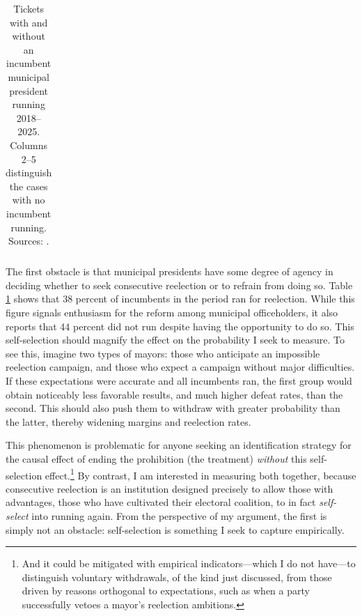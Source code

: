 \documentclass[letter,12pt]{article}
\begin{document}
\begin{table}
\begin{tabular}{crrrrrrr}
    \\ [-2ex] \hline
  \end{tabular}
  \caption{Tickets with and without an incumbent municipal president running 2018--2025. Columns 2--5 distinguish the cases with no incumbent running. Sources: \citet{magar.el.dataset.2026}.}\label{T:incballot}
\end{table}

\noindent The first obstacle is that municipal presidents have some degree of agency in deciding whether to seek consecutive reelection or to refrain from doing so. Table \ref{T:incballot} shows that 38 percent of incumbents in the period ran for reelection. While this figure signals enthusiasm for the reform among municipal officeholders, it also reports that 44 percent did not run despite having the opportunity to do so. This self-selection should magnify the effect on the probability I seek to measure. To see this, imagine two types of mayors: those who anticipate an impossible reelection campaign, and those who expect a campaign without major difficulties. If these expectations were accurate and all incumbents ran, the first group would obtain noticeably less favorable results, and much higher defeat rates, than the second. This should also push them to withdraw with greater probability than the latter, thereby widening margins and reelection rates.

This phenomenon is problematic for anyone seeking an identification strategy for the causal effect of ending the prohibition (the treatment) \emph{without} this self-selection effect.\footnote{And it could be mitigated with empirical indicators---which I do not have---to distinguish voluntary withdrawals, of the kind just discussed, from those driven by reasons orthogonal to expectations, such as when a party successfully vetoes a mayor’s reelection ambitions.} By contrast, I am interested in measuring both together, because consecutive reelection is an institution designed precisely to allow those with advantages, those who have cultivated their electoral coalition, to in fact \emph{self-select} into running again. From the perspective of my argument, the first is simply not an obstacle: self-selection is something I seek to capture empirically.
\end{document}
